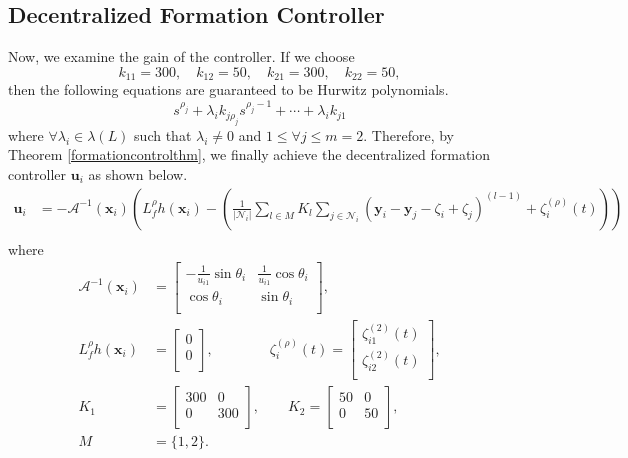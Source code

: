 \documentclass[11pt, a4paper, oneside, openany, reqno]{book}
\theoremstyle{definition}
\theoremstyle{remark}
\numberwithin{equation}{chapter} %
\newcommand{\A}{\mathcal{A}}
\newcommand{\x}{\textbf{x}}
\newcommand{\y}{\textbf{y}}
\newcommand{\U}{\textbf{u}}
\newcommand{\NBR}{\mathcal{N}}
\begin{document}
\subsection{Decentralized Formation Controller}
Now, we examine the gain of the controller.
If we choose
\begin{equation} 
	k_{11} = 300,\quad k_{12} = 50 ,\quad	k_{21} = 300,\quad k_{22} = 50,
\end{equation}
then the following equations are guaranteed to be Hurwitz polynomials.
\begin{equation}
	s^{\rho_j} + \lambda_i k_{j\rho_j} s^{\rho_j-1} + \cdots + \lambda_i k_{j1} 
\end{equation}
where $ \forall \lambda_i \in \lambda(L) $ 
such that $ \lambda_i \neq 0 $ and $ 1 \leq \forall j \leq m=2 $.
Therefore, by Theorem \ref{formationcontrolthm},
we finally achieve the decentralized formation controller $ \U_i $ as shown below.
\begin{equation}\begin{split}\label{excontroller}
	\U_i &= -\A^{-1}(\x_i) \left( L_f^\rho h(\x_i)			
		- \left( \frac{1}{\vert \NBR_i \vert} \sum_{l \in M}
			K_{l}  \sum_{j \in \NBR_i } (\y_i - \y_j -  \zeta_{i} + \zeta_{j}) ^{(l-1)}  
			+  \zeta_{i}^{(\rho)}(t) \right)\right)\\			
\end{split}\end{equation} 	
where
\begin{equation}\begin{split}
	\A^{-1}(\x_i) &=\left[ \begin{array}{cc } -\frac{1}{u_{i1}} \sin\theta_i &  \frac{1}{u_{i1}} \cos\theta_i \\ 
					\cos\theta_i & \sin\theta_i \\ \end{array} \right], \\
	L_f^\rho h(\x_i) &= \left[ \begin{array}{c } 0 \\ 0 \\ \end{array} \right], \qquad	\qquad	
	\zeta_i^{(\rho)} (t) %
		= \left[ \begin{array}{c } \zeta_{i1}^{(2)}(t) \\ \zeta_{i2}^{(2)}(t) \\ \end{array} \right],\\	
	K_1 &= \left[ \begin{array}{cc } 300 & 0 \\ 0 & 300 \\ \end{array} \right], \qquad
	K_2 = \left[ \begin{array}{cc } 50 & 0 \\ 0 & 50 \\ \end{array} \right], \\
	M &=\lbrace 1, 2\rbrace. \\
\end{split}\end{equation}
\end{document}
